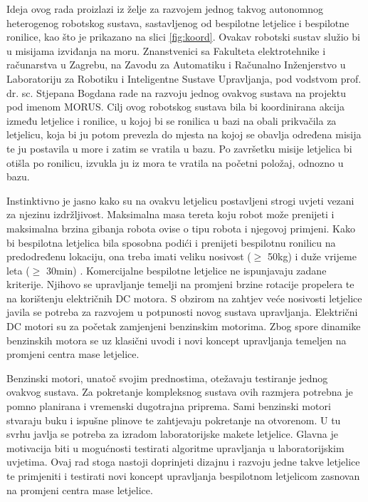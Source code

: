 \documentclass[11pt,a4paper]{article}
\begin{document}
Ideja ovog rada proizlazi iz želje za razvojem jednog takvog autonomnog heterogenog robotskog sustava, sastavljenog od bespilotne letjelice i bespilotne ronilice, kao što je prikazano na slici \ref{fig:koord}. Ovakav robotski sustav služio bi u misijama izviđanja na moru. Znanstvenici sa Fakulteta elektrotehnike i računarstva u Zagrebu, na Zavodu za Automatiku i Računalno Inženjerstvo u Laboratoriju za Robotiku i Inteligentne Sustave Upravljanja, pod vodstvom prof. dr. sc. Stjepana Bogdana rade na razvoju jednog ovakvog sustava na projektu pod imenom MORUS. Cilj ovog robotskog sustava bila bi koordinirana akcija između letjelice i ronilice, u kojoj bi se ronilica u bazi na obali prikvačila za letjelicu, koja bi ju potom prevezla do mjesta na kojoj se obavlja određena misija te ju postavila u more i zatim se vratila u bazu. Po završetku misije letjelica bi otišla po ronilicu, izvukla ju iz mora te vratila na početni položaj, odnozno u bazu. \cite{haus2}


\medskip


Instinktivno je jasno kako su na ovakvu letjelicu postavljeni strogi uvjeti vezani za njezinu izdržljivost. Maksimalna masa tereta koju robot može prenijeti i maksimalna brzina gibanja robota ovise o tipu robota i njegovoj primjeni. \cite{kova}  Kako bi bespilotna letjelica bila sposobna podići i prenijeti bespilotnu ronilicu na predodređenu lokaciju, ona treba imati veliku nosivost ($\geq$ 50kg) i duže vrijeme leta ($\geq$ 30min) . Komercijalne bespilotne letjelice ne ispunjavaju zadane kriterije. Njihovo se upravljanje temelji na promjeni brzine rotacije propelera te na korištenju električnih DC motora. S obzirom na zahtjev veće nosivosti letjelice javila se potreba za razvojem u potpunosti novog sustava upravljanja. Električni DC motori su za početak zamjenjeni benzinskim motorima. Zbog spore dinamike benzinskih motora se uz klasični uvodi i novi koncept upravljanja temeljen na promjeni centra mase letjelice. \cite{haus1}

\medskip

Benzinski motori, unatoč svojim prednostima, otežavaju testiranje jednog ovakvog sustava. Za pokretanje kompleksnog sustava ovih razmjera potrebna je pomno planirana i vremenski dugotrajna priprema. Sami benzinski motori stvaraju buku i ispušne plinove te zahtjevaju pokretanje na otvorenom. U tu svrhu javlja se potreba za izradom laboratorijske makete letjelice. Glavna je motivacija biti u mogućnosti testirati algoritme upravljanja u laboratorijskim uvjetima. Ovaj rad stoga nastoji doprinjeti dizajnu i razvoju jedne takve letjelice te primjeniti i testirati novi koncept upravljanja bespilotnom letjelicom zasnovan na promjeni centra mase letjelice. 
\end{document}
